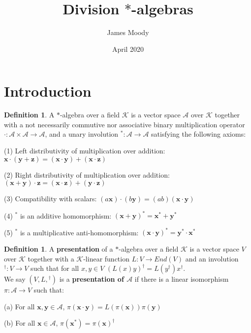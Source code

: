 \documentclass[12pt]{article}
\title{Division $*$-algebras}
\author{James Moody}
\date{April 2020}
\theoremstyle{definition}
\newtheorem{definition}[theorem]{Definition}
\theoremstyle{remark}
\begin{document}
\maketitle

\section*{Introduction} 

\begin{definition} A $*$-algebra over a field $\mathcal{K}$ is a vector space $\mathcal{A}$ over $\mathcal{K}$ together with a not necessarily commutive nor associative binary multiplication operator $\cdot: \mathcal{A} \times \mathcal{A} \rightarrow \mathcal{A}$, and a unary involution $^*:\mathcal{A} \rightarrow \mathcal{A}$ satisfying the following axioms:

(1) Left distributivity of multiplication over addition: $\mathbf{x} \cdot (\mathbf{y} + \mathbf{z}) = (\mathbf{x} \cdot \mathbf{y}) + (\mathbf{x} \cdot \mathbf{z})$

(2) Right distributivity of multiplication over addition: $(\mathbf{x}+\mathbf{y}) \cdot \mathbf{z} = (\mathbf{x} \cdot \mathbf{z}) + (\mathbf{y} \cdot \mathbf{z})$

(3) Compatibility with scalars: $(a\mathbf{x}) \cdot (b \mathbf{y}) = (ab)(\mathbf{x} \cdot \mathbf{y})$

(4) $^*$ is an additive homomorphism: $(\mathbf{x}+\mathbf{y})^* = \mathbf{x}^* + \mathbf{y}^*$

(5) $^*$ is a multiplicative anti-homomorphism: $(\mathbf{x} \cdot \mathbf{y})^* = \mathbf{y}^* \cdot \mathbf{x}^*$
\end{definition}

\begin{definition} A \textbf{presentation} of a $*$-algebra over a field $\mathcal{K}$ is a vector space $V$ over \(\mathcal{K}\) together with a $\mathcal{K}$-linear function $L: V \rightarrow End(V)$ and an involution $^{\dagger} : V \rightarrow V$ such that for all \(x,y \in V\) $(L(x)y)^{\dagger} = L(y^{\dagger}) x^{\dagger}$.\\

\noindent We say \((V, L, {}^\dagger)\) is a \textbf{presentation of \(\mathcal{A}\)} if there is a linear isomorphism \(\pi: \mathcal{A} \rightarrow V\) such that:

(a) For all $\mathbf{x}, \mathbf{y} \in \mathcal{A}$, $\pi(\mathbf{x} \cdot \mathbf{y}) = L(\pi(\mathbf{x})) \pi(\mathbf{y})$ 

(b) For all $\mathbf{x} \in \mathcal{A}$, $\pi(\mathbf{x}^*) = \pi(\mathbf{x})^{\dagger}$
\end{definition} 
\end{document}
